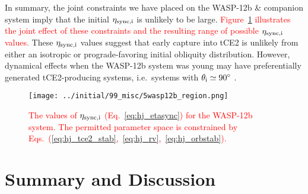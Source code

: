 \documentclass[
        fleqn,
        usenatbib,
        referee
    ]{mnras}
\newlength{\colummwidth}
\begin{document}
In summary, the joint constraints we have placed on the WASP-12b \& companion
system imply that the initial $\eta_{\rm sync, i}$ is unlikely to be large.
\textcolor{red}{Figure~\ref{fig:wasp12b_constr} illustrates the joint effect of
these constraints and the resulting range of possible $\eta_{\rm sync, i}$
values.} These $\eta_{\rm sync, i}$ values suggest that early capture into tCE2
is unlikely from either an isotropic or prograde-favoring initial obliquity
distribution. However, dynamical effects when the WASP-12b system was young may
have preferentially generated tCE2-producing systems, i.e.\ systems with
$\theta_{\rm i} \simeq 90^\circ$ \citep[e.g.\ the presence of an exterior
protoplanetary disk][]{millholland_disk, su2020}.
\begin{figure}
    \centering
    \texttt{[image: ../initial/99\_misc/5wasp12b\_region.png]}
    \caption{\textcolor{red}{The values of $\eta_{\rm sync, i}$
    (Eq.~\ref{eq:hj_etasync}) for the WASP-12b system. The permitted parameter
    space is constrained by
    Eqs.~(\ref{eq:hj_tce2_stab},~\ref{eq:hj_rv},~\ref{eq:hj_orbstab}).
    }}\label{fig:wasp12b_constr}
\end{figure}

\section{Summary and Discussion}\label{s:summary}
\end{document}
